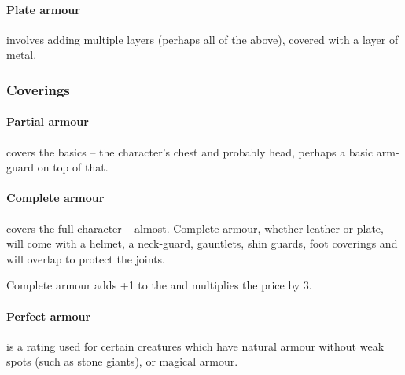 \begin{multicols}{2}
\paragraph{Plate armour}
involves adding multiple layers (perhaps all of the above), covered with a layer of metal.

\subsubsection{Coverings}

\paragraph{Partial armour}
covers the basics -- the character's chest and probably head, perhaps a basic arm-guard on top of that.

\paragraph{Complete armour}
covers the full character -- almost.
Complete armour, whether leather or plate, will come with a helmet, a neck-guard, gauntlets, shin guards, foot coverings and will overlap to protect the joints.

Complete armour adds +1 to the  and multiplies the price by 3.

\paragraph{Perfect armour}
is a rating used for certain creatures which have natural armour without weak spots (such as stone giants), or magical armour.

\end{multicols}
